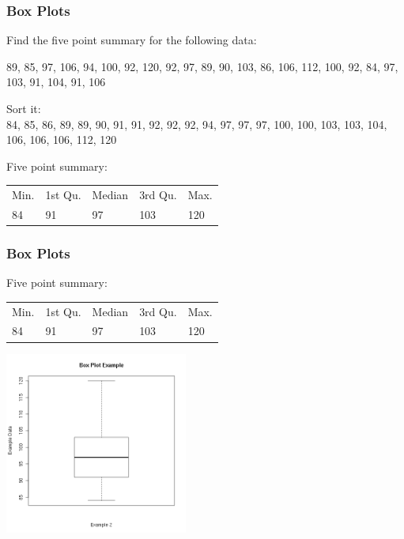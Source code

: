 \begin{frame}
  \frametitle{Box Plots}

  \vfill 

  Find the five point summary for the following data:

  \vfill

  {
    89, 85, 97, 106, 94, 100, 92, 120, 92, 97, 89, 90, 103, 86, 106, 112, 100, 92, 84,
    97, 103, 91, 104, 91, 106

    \vfill
  }

  {
    Sort it: \\
    84, 85, 86, 89, 89, 90, 91, 91, 92, 92, 92, 94, 97, 97, 97, 100,
    100, 103, 103, 104, 106, 106, 106, 112, 120

    Five point summary: \\
    \begin{tabular}{lllll}
     Min. & 1st Qu. & Median    & 3rd Qu. &   Max. \\
     84   & 91      & 97        & 103     & 120
    \end{tabular}


  }

  \vfill

\end{frame}


\begin{frame}
  \frametitle{Box Plots}

    Five point summary: \\
    \begin{tabular}{lllll}
     Min. & 1st Qu. & Median    & 3rd Qu. &   Max. \\
     84   & 91      & 97        & 103     & 120
    \end{tabular}

    \begin{center}
      \includegraphics[width=6cm]{img/boxplotExample1}
    \end{center}

\end{frame}


